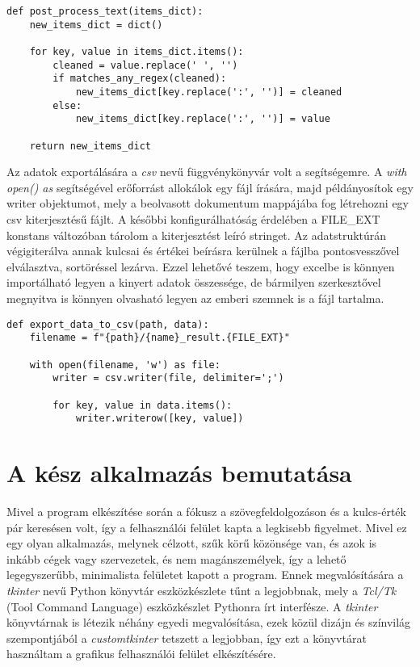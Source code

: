 \documentclass[12pt]{report}
\begin{document}
\begin{verbatim}
def post_process_text(items_dict):
    new_items_dict = dict()

    for key, value in items_dict.items():
        cleaned = value.replace(' ', '')
        if matches_any_regex(cleaned):
            new_items_dict[key.replace(':', '')] = cleaned
        else:
            new_items_dict[key.replace(':', '')] = value

    return new_items_dict
\end{verbatim}

Az adatok exportálására a \emph{csv} nevű függvénykönyvár volt a segítségemre. A \emph{with open() as} segítségével erőforrást allokálok egy fájl írására, majd példányosítok egy writer objektumot, mely a beolvasott dokumentum mappájába fog létrehozni egy csv kiterjesztésű fájlt. A későbbi konfigurálhatóság érdelében a FILE\_EXT konstans változóban tárolom a kiterjesztést leíró stringet. Az adatstruktúrán végigiterálva annak kulcsai és értékei beírásra kerülnek a fájlba pontosvesszővel elválasztva, sortöréssel lezárva. Ezzel lehetővé teszem, hogy excelbe is könnyen importálható legyen a kinyert adatok összessége, de bármilyen szerkesztővel megnyitva is könnyen olvasható legyen az emberi szemnek is a fájl tartalma.

\begin{verbatim}
def export_data_to_csv(path, data):
    filename = f"{path}/{name}_result.{FILE_EXT}"

    with open(filename, 'w') as file:
        writer = csv.writer(file, delimiter=';')

        for key, value in data.items():
            writer.writerow([key, value])
\end{verbatim}

\chapter{A kész alkalmazás bemutatása}

Mivel a program elkészítése során a fókusz a szövegfeldolgozáson és a kulcs-érték pár keresésen volt, így a felhasználói felület kapta a legkisebb figyelmet. Mivel ez egy olyan alkalmazás, melynek célzott, szűk körű közönsége van, és azok is inkább cégek vagy szervezetek, és nem magánszemélyek, így a lehető legegyszerűbb, minimalista felületet kapott a program.
Ennek megvalósítására a \emph{tkinter} nevű Python könyvtár eszközkészlete tűnt a legjobbnak, mely a \emph{Tcl/Tk} (Tool Command Language) eszközkészlet Pythonra írt interfésze. A \emph{tkinter} könyvtárnak is létezik néhány egyedi megvalósítása, ezek közül dizájn és színvilág szempontjából a \emph{customtkinter} tetszett a legjobban, így ezt a könyvtárat használtam a grafikus felhasználói felület elkészítésére.
\end{document}
